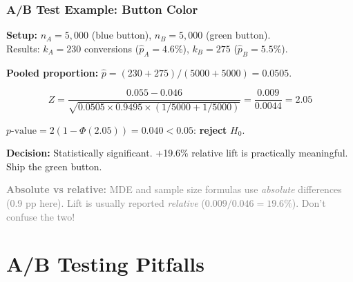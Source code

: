 \documentclass[aspectratio=169]{beamer}
\begin{document}
\begin{frame}
\frametitle{A/B Test Example: Button Color}

\small
\textbf{Setup:} $n_A = 5{,}000$ (blue button), $n_B = 5{,}000$ (green button).\\
Results: $k_A = 230$ conversions ($\hat{p}_A = 4.6\%$), $k_B = 275$ ($\hat{p}_B = 5.5\%$).

\vspace{0.15cm}
\textbf{Pooled proportion:} $\hat{p} = (230 + 275)/(5000 + 5000) = 0.0505$.

$$Z = \frac{0.055 - 0.046}{\sqrt{0.0505 \times 0.9495 \times (1/5000 + 1/5000)}} = \frac{0.009}{0.0044} = 2.05$$

\vspace{0.1cm}
$p\text{-value} = 2(1 - \Phi(2.05)) = 0.040 < 0.05$: \textbf{reject} $H_0$.

\vspace{0.15cm}
\begin{center}
\end{center}

\vspace{0.05cm}
\small\textbf{Decision:} Statistically significant. +19.6\% relative lift is practically meaningful. Ship the green button.

\vspace{0.02cm}
{\scriptsize\textcolor{gray}{\textbf{Absolute vs relative:} MDE and sample size formulas use \emph{absolute} differences (0.9 pp here). Lift is usually reported \emph{relative} ($0.009/0.046 = 19.6\%$). Don't confuse the two!}}
\end{frame}

\section{A/B Testing Pitfalls}
\end{document}
